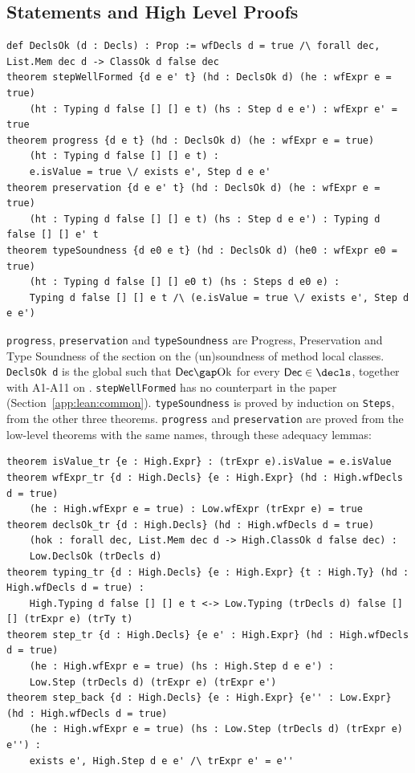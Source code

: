 \subsection{Statements and High Level Proofs}
\label{app:lean:statements}
\begin{lstlisting}[language=lean,basicstyle=\scriptsize\ttfamily]
def DeclsOk (d : Decls) : Prop := wfDecls d = true /\ forall dec, List.Mem dec d -> ClassOk d false dec
theorem stepWellFormed {d e e' t} (hd : DeclsOk d) (he : wfExpr e = true)
    (ht : Typing d false [] [] e t) (hs : Step d e e') : wfExpr e' = true
theorem progress {d e t} (hd : DeclsOk d) (he : wfExpr e = true)
    (ht : Typing d false [] [] e t) :
    e.isValue = true \/ exists e', Step d e e'
theorem preservation {d e e' t} (hd : DeclsOk d) (he : wfExpr e = true)
    (ht : Typing d false [] [] e t) (hs : Step d e e') : Typing d false [] [] e' t
theorem typeSoundness {d e0 e t} (hd : DeclsOk d) (he0 : wfExpr e0 = true)
    (ht : Typing d false [] [] e0 t) (hs : Steps d e0 e) :
    Typing d false [] [] e t /\ (e.isValue = true \/ exists e', Step d e e')
\end{lstlisting}
\texttt{progress}, \texttt{preservation} and \texttt{typeSoundness} are Progress, Preservation and Type Soundness of the section on the (un)soundness of method local classes.
\texttt{DeclsOk d} is the global \decls such that $\mathsf{Dec}\gap\mathrm{Ok}$ for every $\mathsf{Dec}\in\decls$, together with A1-A11 on \decls.
\texttt{stepWellFormed} has no counterpart in the paper (Section~\ref{app:lean:common}).
\texttt{typeSoundness} is proved by induction on \texttt{Steps}, from the other three theorems.
\texttt{progress} and \texttt{preservation} are proved from the low-level theorems with the same names, through these adequacy lemmas:
\begin{lstlisting}[language=lean,basicstyle=\scriptsize\ttfamily]
theorem isValue_tr {e : High.Expr} : (trExpr e).isValue = e.isValue
theorem wfExpr_tr {d : High.Decls} {e : High.Expr} (hd : High.wfDecls d = true)
    (he : High.wfExpr e = true) : Low.wfExpr (trExpr e) = true
theorem declsOk_tr {d : High.Decls} (hd : High.wfDecls d = true)
    (hok : forall dec, List.Mem dec d -> High.ClassOk d false dec) :
    Low.DeclsOk (trDecls d)
theorem typing_tr {d : High.Decls} {e : High.Expr} {t : High.Ty} (hd : High.wfDecls d = true) :
    High.Typing d false [] [] e t <-> Low.Typing (trDecls d) false [] [] (trExpr e) (trTy t)
theorem step_tr {d : High.Decls} {e e' : High.Expr} (hd : High.wfDecls d = true)
    (he : High.wfExpr e = true) (hs : High.Step d e e') :
    Low.Step (trDecls d) (trExpr e) (trExpr e')
theorem step_back {d : High.Decls} {e : High.Expr} {e'' : Low.Expr} (hd : High.wfDecls d = true)
    (he : High.wfExpr e = true) (hs : Low.Step (trDecls d) (trExpr e) e'') :
    exists e', High.Step d e e' /\ trExpr e' = e''
\end{lstlisting}
